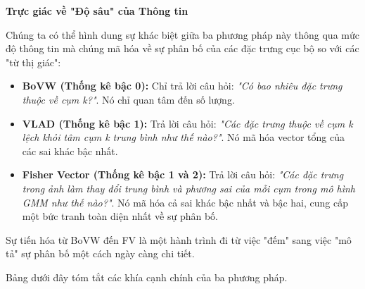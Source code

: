 \begin{mdframed}[style=infobox]
    \textbf{Trực giác về "Độ sâu" của Thông tin}
    
    Chúng ta có thể hình dung sự khác biệt giữa ba phương pháp này thông qua mức độ thông tin mà chúng mã hóa về sự phân bố của các đặc trưng cục bộ so với các "từ thị giác":
    \begin{itemize}
        \item \textbf{BoVW (Thống kê bậc 0):} Chỉ trả lời câu hỏi: \textit{"Có bao nhiêu đặc trưng thuộc về cụm k?"}. Nó chỉ quan tâm đến số lượng.
        \item \textbf{VLAD (Thống kê bậc 1):} Trả lời câu hỏi: \textit{"Các đặc trưng thuộc về cụm k lệch khỏi tâm cụm k trung bình như thế nào?"}. Nó mã hóa vector tổng của các sai khác bậc nhất.
        \item \textbf{Fisher Vector (Thống kê bậc 1 và 2):} Trả lời câu hỏi: \textit{"Các đặc trưng trong ảnh làm thay đổi trung bình và phương sai của mỗi cụm trong mô hình GMM như thế nào?"}. Nó mã hóa cả sai khác bậc nhất và bậc hai, cung cấp một bức tranh toàn diện nhất về sự phân bố.
    \end{itemize}
    Sự tiến hóa từ BoVW đến FV là một hành trình đi từ việc "đếm" sang việc "mô tả" sự phân bố một cách ngày càng chi tiết.
\end{mdframed}

Bảng dưới đây tóm tắt các khía cạnh chính của ba phương pháp.

